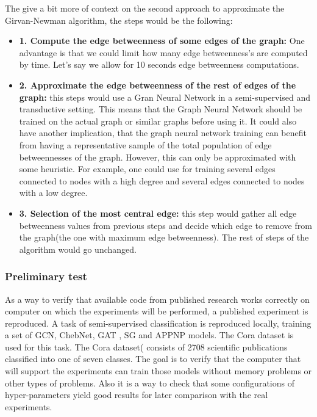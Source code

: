 The give a bit more of context on the second approach to approximate the Girvan-Newman algorithm, the steps would be the following:
\begin{itemize}
	\item \textbf{1. Compute the edge betweenness of some edges of the graph:} One advantage is that we could limit how many edge betweenness's are computed by time. Let's say we allow for 10 seconds edge betweenness computations.
	\item \textbf{2. Approximate the edge betweenness of the rest of edges of the graph:} this steps would use a Gran Neural Network in a semi-supervised and transductive setting. This means that the Graph Neural Network should be trained on the actual graph or similar graphs before using it. It could also have another implication, that the graph neural network training can benefit from having a representative sample of the total population of edge betweennesses of the graph. However, this can only be approximated with some heuristic. For example, one could use for training several edges connected to nodes with a high degree and several edges connected to nodes with a low degree.
	\item \textbf{3. Selection of the most central edge:} this step would gather all edge betweenness values from previous steps and decide which edge to remove from the graph(the one with maximum edge betweenness). The rest of steps of the algorithm would go unchanged.
\end{itemize}




\subsubsection{Preliminary test}

As a way to verify that available code from published research works correctly on computer on which the experiments will be performed, a published experiment is reproduced. A task of semi-supervised classification is reproduced locally, training a set of GCN, ChebNet, GAT , SG and APPNP models. The Cora dataset is used for this task.  The Cora dataset(\cite{sen2008collective} consists of 2708 scientific publications classified into one of seven classes. The goal is to verify that the computer that will support the experiments can train those models without memory problems or other types of problems. Also it is a way to check that some configurations of hyper-parameters yield good results for later comparison with the real experiments. 


